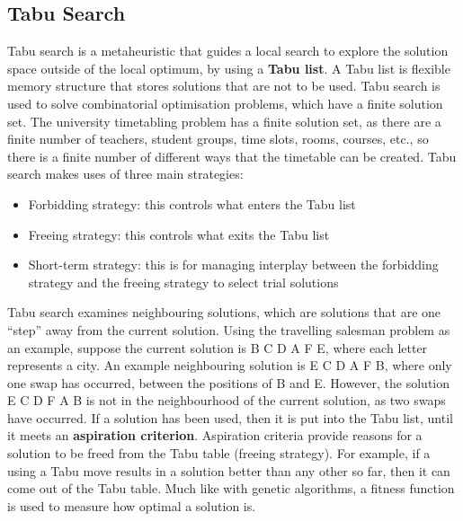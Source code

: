 \documentclass[a4paper, 12pt]{report}
\begin{document}
\subsection{Tabu Search}

Tabu search is a metaheuristic that guides a local search to explore the
solution space outside of the local optimum, by using a \textbf{Tabu list}.
A Tabu list is flexible memory structure that stores solutions that are not to
be used.
Tabu search is used to solve combinatorial optimisation problems, which have a
finite solution set.
The university timetabling problem has a finite solution set, as there are a
finite number of teachers, student groups, time slots, rooms, courses, etc., so
there is a finite number of different ways that the timetable can be created.
Tabu search makes uses of three main strategies:
\begin{itemize}
	\item Forbidding strategy: this controls what enters the Tabu list
	\item Freeing strategy: this controls what exits the Tabu list
	\item Short-term strategy: this is for managing interplay between the
		forbidding strategy and the freeing strategy to select trial solutions
\end{itemize}
Tabu search examines neighbouring solutions, which are solutions that are one
“step” away from the current solution.
Using the travelling salesman problem as an example, suppose the current
solution is B C D A F E, where each letter represents a city.
An example neighbouring solution is E C D A F B, where only one swap has
occurred, between the positions of B and E.
However, the solution E C D F A B is not in the neighbourhood of the current
solution, as two swaps have occurred.
If a solution has been used, then it is put into the Tabu list, until it meets
an \textbf{aspiration criterion}.
Aspiration criteria provide reasons for a solution to be freed from the Tabu
table (freeing strategy).
For example, if a using a Tabu move results in a solution better than any other
so far, then it can come out of the Tabu table. Much like with genetic
algorithms, a fitness function is used to measure how optimal a solution is.
\end{document}
